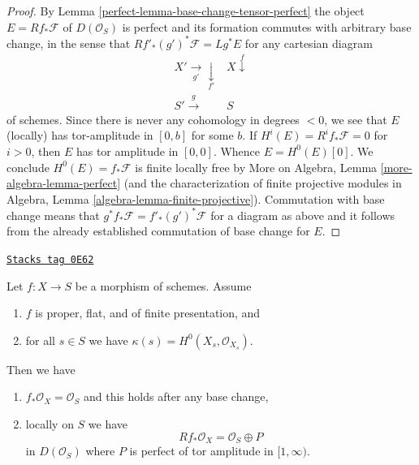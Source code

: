\begin{proof}

By Lemma \ref{perfect-lemma-base-change-tensor-perfect}
the object $E = Rf_*\mathcal{F}$ of $D(\mathcal{O}_S)$
is perfect and its formation commutes with arbitrary base change,
in the sense that $Rf'_*(g')^*\mathcal{F} = Lg^*E$
for any cartesian diagram
$$
\begin{array}{cc}X' \underset{g'}{\longrightarrow}\underset{f'}{\downarrow} & X \overset{f}{\downarrow} \\ S' \overset{g}{\longrightarrow} & S\end{array}
$$
of schemes.
Since there is never any cohomology in degrees $< 0$, we see that
$E$ (locally) has tor-amplitude in $[0, b]$ for some $b$.
If $H^i(E) = R^if_*\mathcal{F} = 0$ for $i > 0$,
then $E$ has tor amplitude in $[0, 0]$. Whence
$E = H^0(E)[0]$. We conclude $H^0(E) = f_*\mathcal{F}$
is finite locally free by
More on Algebra, Lemma \ref{more-algebra-lemma-perfect}
(and the characterization of finite projective modules
in Algebra, Lemma \ref{algebra-lemma-finite-projective}).
Commutation with base change means that
$g^*f_*\mathcal{F} = f'_*(g')^*\mathcal{F}$ for
a diagram as above and it follows from the already
established commutation of base change for $E$.
\end{proof}

\begin{lemma}
\label{perfect-lemma-proper-flat-h0}
\href{https://stacks.math.columbia.edu/tag/0E62}{\texttt{Stacks tag 0E62}}

Let $f : X \to S$ be a morphism of schemes. Assume
\begin{enumerate}
\item $f$ is proper, flat, and of finite presentation, and
\item for all $s \in S$ we have $\kappa(s) = H^0(X_s, \mathcal{O}_{X_s})$.
\end{enumerate}
Then we have
\begin{enumerate}
\item[(a)] $f_*\mathcal{O}_X = \mathcal{O}_S$ and
this holds after any base change,
\item[(b)] locally on $S$ we have
$$
Rf_*\mathcal{O}_X = \mathcal{O}_S \oplus P
$$
in $D(\mathcal{O}_S)$
where $P$ is perfect of tor amplitude in $[1, \infty)$.
\end{enumerate}
\end{lemma}

